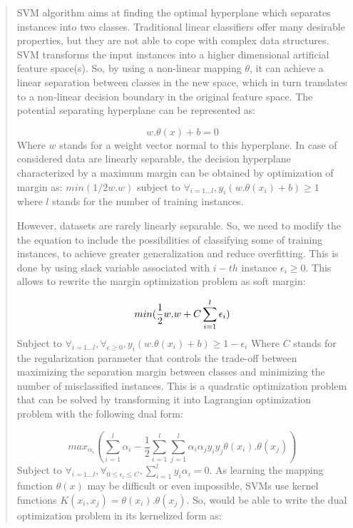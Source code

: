 \begin{quote}
    
        SVM algorithm aims at finding the optimal hyperplane which separates instances into two 
    classes. Traditional linear classifiers offer many desirable properties, but they are not 
    able to cope with complex data structures. SVM transforms the input instances into a higher 
    dimensional artificial feature space(s). So, by using a non-linear mapping $\theta$, 
    it can achieve a linear separation between classes in the new space, 
    which in turn translates to a non-linear decision boundary in the original feature space. 
    The potential separating hyperplane can be represented as:

    \begin{equation}
        w.\theta(x)+b=0
        \label{eq:svmBasic}
    \end{equation}
    Where $w$ stands for a weight vector normal to this hyperplane. In case of considered data 
    are linearly separable, the decision hyperplane characterized by a maximum margin can be 
    obtained by optimization of margin as: $ min(1/2 w.w) $ subject to 
    $\forall_{i=1...l}, y_{i}(w.\theta(x_{i})+b)\geq 1$ where $l$ stands for the number of training instances.

    However, datasets are rarely linearly separable. So, we need to modify the 
    the equation to include the possibilities of classifying some of training instances, 
    to achieve greater generalization and reduce overfitting. This is 
    done by using slack variable associated with $i-th$ instance $\epsilon_{i} \geq 0$. 
    This allows to rewrite the margin optimization problem as soft margin:

    \begin{equation}
        min(\frac{1}{2}w.w+C\sum_{i=1}^{l}\epsilon_{i}) \\
        \label{eq:svmSoftMargin}
    \end{equation}
    Subject to $\forall_{i=1...l}, \forall_{\epsilon\geq0}, y_{i}(w.\theta(x_{i})+b)\geq 1-\epsilon_{i}$
    Where $C$ stands for the regularization parameter that controls the trade-off between maximizing 
    the separation margin between classes and minimizing the number of misclassified instances.
    This is a quadratic optimization problem that can be solved by transforming it into 
    Lagrangian optimization problem with the following dual form:

    \begin{equation}
        max_{\alpha_{i}} \left ( \sum_{i=1}^{l}\alpha_{i} - \frac{1}{2}\sum_{i=1}^{l}\sum_{j=1}^{l}\alpha_{i}\alpha_{j}y_{i}y_{j} \theta(x_{i}).\theta(x_{j}) \right )
        \label{eq:svmLagrange}
    \end{equation}
    Subject to $\forall_{i=1...l}, \forall_{0\leq\epsilon_{i} \leq C}, \sum_{i=1}^{l} y_{i}\alpha_{i}=0$. 
    As learning the mapping function $\theta(x)$ may be difficult or even impossible, SVMs use kernel 
    functions $K(x_{i},x_{j})=\theta(x_{i}).\theta(x_{j})$. So, would be able to write the dual optimization 
    problem in its kernelized form as:


\end{quote}
